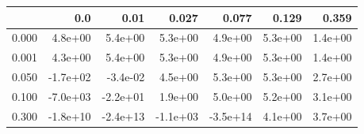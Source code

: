 \begin{tabular}{lrrrrrr}
\toprule
{} &      0.0 &     0.01 &    0.027 &    0.077 &   0.129 &   0.359 \\
\midrule
0.000 &  4.8e+00 &  5.4e+00 &  5.3e+00 &  4.9e+00 & 5.3e+00 & 1.4e+00 \\
0.001 &  4.3e+00 &  5.4e+00 &  5.3e+00 &  4.9e+00 & 5.3e+00 & 1.4e+00 \\
0.050 & -1.7e+02 & -3.4e-02 &  4.5e+00 &  5.3e+00 & 5.3e+00 & 2.7e+00 \\
0.100 & -7.0e+03 & -2.2e+01 &  1.9e+00 &  5.0e+00 & 5.2e+00 & 3.1e+00 \\
0.300 & -1.8e+10 & -2.4e+13 & -1.1e+03 & -3.5e+14 & 4.1e+00 & 3.7e+00 \\
\bottomrule
\end{tabular}
